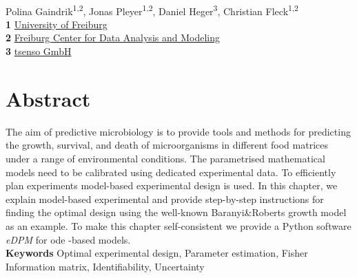 \documentclass[10pt,A4paper]{article}
\providecommand{\keywords}[1]{\textbf{Keywords } #1}
\begin{document}
\vspace*{0.2in}
\begin{flushleft}
{\Large
\textbf{}}
\newline
\\
Polina Gaindrik\textsuperscript{1,2},
Jonas Pleyer\textsuperscript{1,2},
Daniel Heger\textsuperscript{3},
Christian Fleck\textsuperscript{1,2}
\\
\bigskip
\textbf{1} \href{https://www.fdm.uni-freiburg.de/spatsysbio}{University of Freiburg}\\
\textbf{2} \href{https://www.fdm.uni-freiburg.de/spatsysbio}{Freiburg Center for Data Analysis and Modeling}\\
\textbf{3} \href{https://tsenso.com/en/}{tsenso GmbH}\\
\bigskip

\end{flushleft}
\section*{Abstract}
\linenumbers
The aim of predictive microbiology is to provide tools and methods for predicting the growth, survival, and death of microorganisms in different food matrices under a range of environmental conditions. 
The parametrised mathematical models need to be calibrated using dedicated experimental data. 
To efficiently plan experiments model-based experimental design is used. 
In this chapter, we explain model-based experimental and provide step-by-step instructions for finding the optimal design using the well-known Baranyi\&Roberts growth model as an example. 
To make this chapter self-consistent we provide a Python software {\it eDPM} for \ac{ode} -based models.\\
\keywords{Optimal experimental design, Parameter estimation, Fisher Information matrix, Identifiability, Uncertainty}

%
%
%
\end{document}
